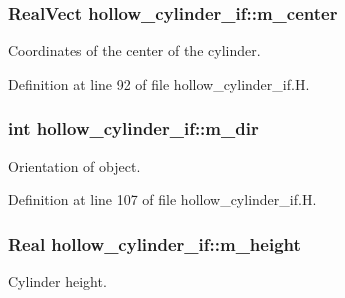 \subsubsection[{\texorpdfstring{m\+\_\+center}{m_center}}]{\setlength{\rightskip}{0pt plus 5cm}Real\+Vect hollow\+\_\+cylinder\+\_\+if\+::m\+\_\+center\hspace{0.3cm}{\ttfamily [protected]}}\hypertarget{classhollow__cylinder__if_a66a7d95e14fec3ce48200c4e392cb34d}{}\label{classhollow__cylinder__if_a66a7d95e14fec3ce48200c4e392cb34d}


Coordinates of the center of the cylinder. 



Definition at line 92 of file hollow\+\_\+cylinder\+\_\+if.\+H.

\subsubsection[{\texorpdfstring{m\+\_\+dir}{m_dir}}]{\setlength{\rightskip}{0pt plus 5cm}int hollow\+\_\+cylinder\+\_\+if\+::m\+\_\+dir\hspace{0.3cm}{\ttfamily [protected]}}\hypertarget{classhollow__cylinder__if_af3ca7b4fbb40dc0b0c4a8bd3d04ec954}{}\label{classhollow__cylinder__if_af3ca7b4fbb40dc0b0c4a8bd3d04ec954}


Orientation of object. 



Definition at line 107 of file hollow\+\_\+cylinder\+\_\+if.\+H.

\subsubsection[{\texorpdfstring{m\+\_\+height}{m_height}}]{\setlength{\rightskip}{0pt plus 5cm}Real hollow\+\_\+cylinder\+\_\+if\+::m\+\_\+height\hspace{0.3cm}{\ttfamily [protected]}}\hypertarget{classhollow__cylinder__if_a25f10212eeb2ef13f33978393a3a0d23}{}\label{classhollow__cylinder__if_a25f10212eeb2ef13f33978393a3a0d23}


Cylinder height. 



